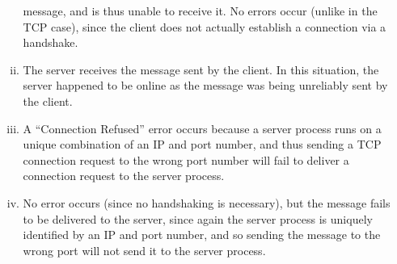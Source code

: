 \documentclass[11pt]{article}
\begin{document}
\begin{enumerate}[(a)]
\begin{enumerate}[(i)]
          message, and is thus unable to receive it. No errors occur (unlike
          in the TCP case), since the client does not actually establish a connection
          via a handshake.
        \item
          The server receives the message sent by the client. In this situation,
          the server happened to be online as the message was being unreliably
          sent by the client.
        \item
          A ``Connection Refused'' error occurs because a server process runs on
          a unique combination of an IP and port number, and thus sending a
          TCP connection request to the wrong port number will fail to deliver
          a connection request to the server process.
        \item
          No error occurs (since no handshaking is necessary), but the message
          fails to be delivered to the server, since again the server process
          is uniquely identified by an IP and port number, and so sending the
          message to the wrong port will not send it to the server process.
      \end{enumerate}
  \end{enumerate}
\end{document}
